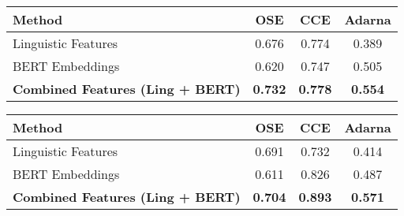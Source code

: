 \documentclass[11pt,a4paper]{article}
\begin{document}
\begin{table*}[!htbp]

    \begin{subtable}[h]{\textwidth}
    \centering
    \begin{tabular}{|l|c|c|c|}
    
    \hline \bf Method & \bf OSE & \bf CCE &\bf  Adarna \\  \hline
    
    Linguistic Features                 & 0.676     & 0.774     & 0.389 \\ \hline
    BERT Embeddings                     & 0.620     & 0.747     & 0.505 \\ \hline
    \bf Combined Features (Ling + BERT)    & \bf 0.732     & \bf 0.778     & \bf 0.554 \\ \hline
    
    \end{tabular}
    \vspace{0.2 cm}
    \label{tab:logreg}
    \end{subtable}
    
    \vspace{0.5 cm}
    
    \begin{subtable}[h]{\textwidth}
    \centering
    \begin{tabular}{|l|c|c|c|}
    
    \hline \bf Method & \bf OSE & \bf CCE &\bf  Adarna \\  \hline
    
    Linguistic Features                 & 0.691     & 0.732     & 0.414 \\ \hline
    BERT Embeddings                     & 0.611     & 0.826     & 0.487 \\ \hline
    \bf Combined Features (Ling + BERT)    & \bf 0.704     & \bf 0.893     & \bf 0.571 \\ \hline
    
    \end{tabular}
    \vspace{0.2 cm}
    \label{tab:svm}
    \end{subtable}
    
    
    \vspace{0.5 cm}
    
    \begin{subtable}[h]{\textwidth}
    \centering
    \begin{tabular}{|l|c|c|c|}
    

\end{tabular}
\end{subtable}
\end{table*}
\end{document}
